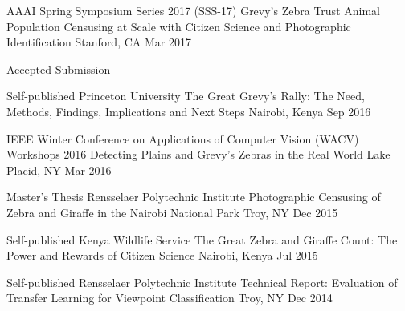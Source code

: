 

\begin{cventries}

  \cventry
    {AAAI Spring Symposium Series 2017 (SSS-17) \dotSep Grevy's Zebra Trust} %
    {Animal Population Censusing at Scale with Citizen Science and Photographic Identification} %
    {Stanford, CA} %
    {Mar 2017} %
    {
     \begin{cvitems}
        \item {Accepted Submission}
      \end{cvitems}
    }

  \cventryshort
    {Self-published \dotSep Princeton University} %
    {The Great Grevy’s Rally: The Need, Methods, Findings, Implications and Next Steps} %
    {Nairobi, Kenya} %
    {Sep 2016} %

  \cventryshort
    {IEEE Winter Conference on Applications of Computer Vision (WACV) Workshops 2016} %
    {Detecting Plains and Grevy's Zebras in the Real World} %
    {Lake Placid, NY} %
    {Mar 2016} %

  \cventryshort
    {Master's Thesis \dotSep Rensselaer Polytechnic Institute} %
    {Photographic Censusing of Zebra and Giraffe in the Nairobi National Park} %
    {Troy, NY} %
    {Dec 2015} %

  \cventryshort
    {Self-published \dotSep Kenya Wildlife Service} %
    {The Great Zebra and Giraffe Count: The Power and Rewards of Citizen Science} %
    {Nairobi, Kenya} %
    {Jul 2015} %

  \cventryshort
    {Self-published \dotSep Rensselaer Polytechnic Institute} %
    {Technical Report: Evaluation of Transfer Learning for Viewpoint Classification} %
    {Troy, NY} %
    {Dec 2014} %


\end{cventries}
